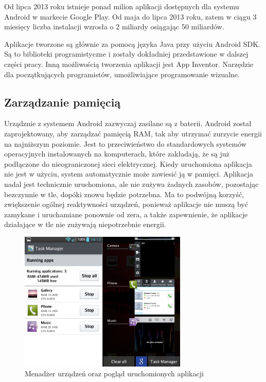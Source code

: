 Od lipca 2013 roku istnieje ponad milion aplikacji dostępnych dla systemu Android w markecie Google Play.\cite{android:34} Od maja do lipca 2013 roku, zatem w ciągu 3 miesięcy liczba instalacji wzrosła o 2 miliardy osiągając 50 miliardów.\cite{android:34}\cite{android:35}

Aplikacje tworzone są głównie za pomocą języka Java przy użyciu Android SDK. Są to biblioteki programistyczne i zostały dokładniej przedstawione w dalszej części pracy. Inną możliwością tworzenia aplikacji jest App Inventor. Narzędzie dla początkujących programistów, umożliwiające programowanie wizualne.

\subsection{Zarządzanie pamięcią}

Urządznie z systemem Android zazwyczaj zasilane są z baterii. Android został zaprojektowany, aby zarządzać pamięcią RAM, tak aby utrzymać zurzycie energii na najniższym poziomie. Jest to przeciwieństwo do standardowych systemów operacyjnych instalowanych na komputerach, które zakładają, że są już podłączone do nieograniczonej sieci elektrycznej. Kiedy uruchomiona aplikacja nie jest w użyciu, system automatycznie może zawiesić ją w pamięci. Aplikacja nadal jest technicznie uruchomiona, ale nie zużywa żadnych zasobów, pozostając bezczynnie w tle, dopóki znowu będzie potrzebna. Ma to podwójną korzyść, zwiększenie ogólnej reaktywności urządzeń, ponieważ aplikacje nie muszą być zamykane i uruchamiane ponownie od zera, a także zapewnienie, że aplikacje działające w tle nie zużywają niepotrzebnie energii.\cite{android:36}\cite{android:37}

\begin{figure}[H] 
\centering\includegraphics[width=8cm]{figures/android/memoryManagment}
\caption{Menadżer urządzeń oraz pogląd uruchomionych aplikacji}
\end{figure}

